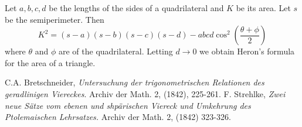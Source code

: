 \documentclass[12pt]{article}
\begin{document}
Let $a,b,c,d$ be the lengths of the sides of a quadrilateral and $K$ be its area.
Let $s$ be the semiperimeter. 
Then
$$
K^2 = (s-a)(s-b)(s-c)(s-d) - abcd \cos^2 \left(\frac{\theta+\phi}{2}\right )
$$
where $\theta$ and $\phi$ are  of the quadrilateral.
Letting $d \to 0$ we obtain Heron's formula for the area of a triangle.

\begin{thebibliography}{99}
C.A. Bretschneider,  \emph{Untersuchung der trigonometrischen Relationen des geradlinigen 
Viereckes}. Archiv der Math. 2, (1842), 225-261.
F. Strehlke,  \emph{Zwei neue S\"atze vom ebenen und shp\"arischen Viereck und 
Umkehrung des Ptolemaischen Lehrsatzes.} Archiv der Math. 2, (1842) 323-326.
\end{thebibliography}
\end{document}

